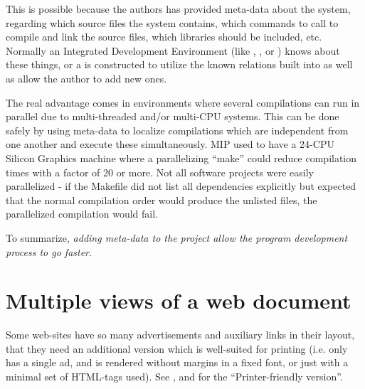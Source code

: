This is possible because the authors has provided meta-data about the
system, regarding which source files the system contains, which
commands to call to compile and link the source files, which libraries
should be included, etc.  Normally an Integrated Development
Environment (like , , or ) knows about these things, or a
 is constructed
to utilize the known relations built into  as well
as allow the author to add new ones.

The real advantage comes in environments where several compilations
can run in parallel due to multi-threaded and/or multi-CPU systems.
This can be done safely by using meta-data to localize compilations
which are independent from one another and execute these
simultaneously.  MIP used to have a 24-CPU Silicon Graphics machine
where a parallelizing ``make'' could reduce compilation times with a
factor of 20 or more.  Not all software projects were easily
parallelized - if the Makefile did not list all dependencies
explicitly but expected that the normal compilation order would
produce the unlisted files, the parallelized compilation would fail.



To summarize, \textit{adding meta-data to the project allow the program
development process to go faster}.


\section{Multiple views of a web document}
\label{sec:multiple-views-of-a-web-document}

 

Some web-sites have so many advertisements and auxiliary links in
their layout, that they need an additional version which is
well-suited for printing (i.e. only has a single ad, and is
rendered without margins in a fixed font, or just with a
minimal set of HTML-tags used).  See
, and  for the
``Printer-friendly version''.

